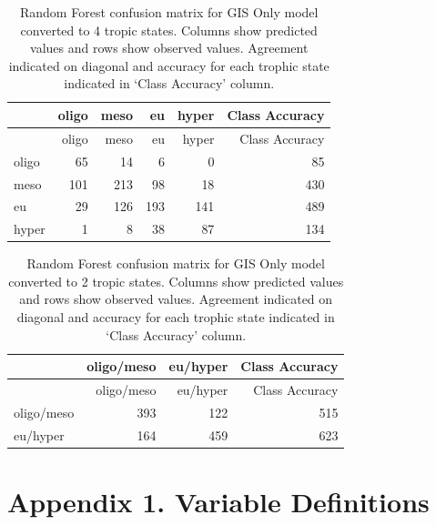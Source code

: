 \documentclass[11pt,]{article}
\begin{document}
\newpage

\begin{longtable}[c]{@{}lrrrrr@{}}
\caption{Random Forest confusion matrix for GIS Only model converted to
4 tropic states. Columns show predicted values and rows show observed
values. Agreement indicated on diagonal and accuracy for each trophic
state indicated in `Class Accuracy' column.
\label{tab:Confusion_GIS_4}}\tabularnewline
\toprule
& oligo & meso & eu & hyper & Class Accuracy\tabularnewline
\midrule
\endfirsthead
\toprule
& oligo & meso & eu & hyper & Class Accuracy\tabularnewline
\midrule
\endhead
oligo & 65 & 14 & 6 & 0 & 85\tabularnewline
meso & 101 & 213 & 98 & 18 & 430\tabularnewline
eu & 29 & 126 & 193 & 141 & 489\tabularnewline
hyper & 1 & 8 & 38 & 87 & 134\tabularnewline
\bottomrule
\end{longtable}

\newpage

\begin{longtable}[c]{@{}lrrr@{}}
\caption{Random Forest confusion matrix for GIS Only model converted to
2 tropic states. Columns show predicted values and rows show observed
values. Agreement indicated on diagonal and accuracy for each trophic
state indicated in `Class Accuracy' column. \label{tab:Confusion_GIS_2}
\newpage}\tabularnewline
\toprule
& oligo/meso & eu/hyper & Class Accuracy\tabularnewline
\midrule
\endfirsthead
\toprule
& oligo/meso & eu/hyper & Class Accuracy\tabularnewline
\midrule
\endhead
oligo/meso & 393 & 122 & 515\tabularnewline
eu/hyper & 164 & 459 & 623\tabularnewline
\bottomrule
\end{longtable}

\section{Appendix 1. Variable
Definitions}\label{appendix-1.-variable-definitions}
\end{document}
